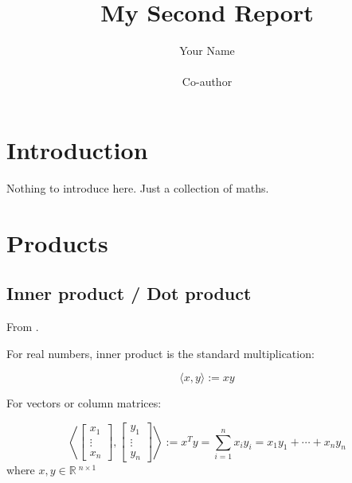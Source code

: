 \documentclass{article}
\title{My Second Report}
\author{Your Name \\ \tit{WHA 160016} \\ \AND
        Co-author \\ \tit{Supervisor} }
\begin{document}
\maketitle




\section{Introduction}
\label{sec: Introduction}

Nothing to introduce here. Just a collection of maths.





\section{Products}
\label{sec: Products}

\subsection{Inner product / Dot product}
\label{subsec: Inner product}

From \cite{wiki2019innerProd,wiki2019dotProd,wiki2019cosineSim}.

For real numbers, inner product is the standard multiplication:

\begin{equation}
    \langle x, y\rangle := x y
\end{equation}

For vectors or column matrices:

\begin{equation}
    \left\langle\left[ \begin{array}{c}{ x_{1}} \\ {\vdots} \\ {x_{n}}\end{array}\right], \left[ \begin{array}{c}{y_{1}} \\ {\vdots} \\ {y_{n}}\end{array}\right]\right\rangle := x^{T} y=\sum_{i=1}^{n} x_{i} y_{i}=x_{1} y_{1}+\cdots+x_{n} y_{n}
\end{equation}
\noindent
where $x, y \in\mathbb{R}\:^{n \times 1}$
\end{document}
